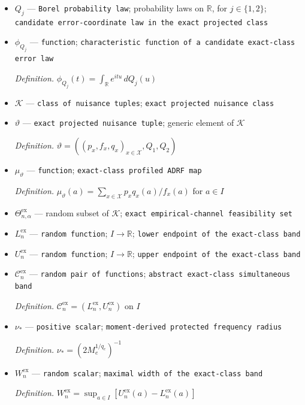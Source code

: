 \documentclass{article}
\begin{document}
\begin{itemize}
  \item \(Q_j\) --- \texttt{Borel probability law}; probability laws on \(\mathbb R\), for \(j\in\{1,2\}\); \texttt{candidate error-\allowbreak{}coordinate law in the exact projected class}
  \item \(\phi_{Q_j}\) --- \texttt{function}; \texttt{characteristic function of a candidate exact-\allowbreak{}class error law}
  \par\smallskip\noindent\emph{Definition.} \(\phi_{Q_j}(t)=\int_{\mathbb R}e^{itu}\,dQ_j(u)\)
  \item \(\mathscr K\) --- \texttt{class of nuisance tuples}; \texttt{exact projected nuisance class}
  \item \(\vartheta\) --- \texttt{exact projected nuisance tuple}; generic element of \(\mathscr K\)
  \par\smallskip\noindent\emph{Definition.} \(\vartheta=((p_x,f_x,q_x)_{x\in\mathcal X},Q_1,Q_2)\)
  \item \(\mu_{\vartheta}\) --- \texttt{function}; \texttt{exact-\allowbreak{}class profiled ADRF map}
  \par\smallskip\noindent\emph{Definition.} \(\mu_{\vartheta}(a)=\sum_{x\in\mathcal X}p_xq_x(a)/f_x(a)\) for \(a\in I\)
  \item \(\Theta^{\mathrm{ex}}_{n,\alpha}\) --- random subset of \(\mathscr K\); \texttt{exact empirical-\allowbreak{}channel feasibility set}
  \item \(L_n^{\mathrm{ex}}\) --- \texttt{random function}; \(I\to\mathbb R\); \texttt{lower endpoint of the exact-\allowbreak{}class band}
  \item \(U_n^{\mathrm{ex}}\) --- \texttt{random function}; \(I\to\mathbb R\); \texttt{upper endpoint of the exact-\allowbreak{}class band}
  \item \(\mathcal C_n^{\mathrm{ex}}\) --- \texttt{random pair of functions}; \texttt{abstract exact-\allowbreak{}class simultaneous band}
  \par\smallskip\noindent\emph{Definition.} \(\mathcal C_n^{\mathrm{ex}}=(L_n^{\mathrm{ex}},U_n^{\mathrm{ex}})\) on \(I\)
  \item \(\nu_*\) --- \texttt{positive scalar}; \texttt{moment-\allowbreak{}derived protected frequency radius}
  \par\smallskip\noindent\emph{Definition.} \(\nu_*=(2M_e^{1/q_e})^{-1}\)
  \item \(W_n^{\mathrm{ex}}\) --- \texttt{random scalar}; \texttt{maximal width of the exact-\allowbreak{}class band}
  \par\smallskip\noindent\emph{Definition.} \(W_n^{\mathrm{ex}}=\sup_{a\in I}[U_n^{\mathrm{ex}}(a)-L_n^{\mathrm{ex}}(a)]\)

\end{itemize}
\end{document}
